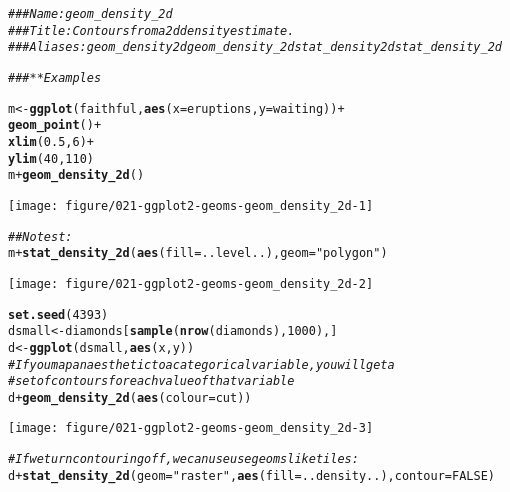 \documentclass[a4paper,titlepage]{tufte-handout}\usepackage[]{graphicx}\usepackage[]{color}
\makeatletter
\def\maxwidth{ %
  \ifdim\Gin@nat@width>\linewidth
    \linewidth
  \else
    \Gin@nat@width
  \fi
}
\newcommand{\hlnum}[1]{\textcolor[rgb]{0.686,0.059,0.569}{#1}}%
\newcommand{\hlstr}[1]{\textcolor[rgb]{0.192,0.494,0.8}{#1}}%
\newcommand{\hlcom}[1]{\textcolor[rgb]{0.678,0.584,0.686}{\textit{#1}}}%
\newcommand{\hlopt}[1]{\textcolor[rgb]{0,0,0}{#1}}%
\newcommand{\hlstd}[1]{\textcolor[rgb]{0.345,0.345,0.345}{#1}}%
\newcommand{\hlkwb}[1]{\textcolor[rgb]{0.69,0.353,0.396}{#1}}%
\newcommand{\hlkwc}[1]{\textcolor[rgb]{0.333,0.667,0.333}{#1}}%
\newcommand{\hlkwd}[1]{\textcolor[rgb]{0.737,0.353,0.396}{\textbf{#1}}}%
\newenvironment{kframe}{%
 \def\at@end@of@kframe{}%
 \ifinner\ifhmode%
  \def\at@end@of@kframe{\end{minipage}}%
  \begin{minipage}{\columnwidth}%
 \fi\fi%
 \def\FrameCommand##1{\hskip\@totalleftmargin \hskip-\fboxsep
 \colorbox{shadecolor}{##1}\hskip-\fboxsep
     \hskip-\linewidth \hskip-\@totalleftmargin \hskip\columnwidth}%
 \MakeFramed {\advance\hsize-\width
   \@totalleftmargin\z@ \linewidth\hsize
   \@setminipage}}%
 {\par\unskip\endMakeFramed%
 \at@end@of@kframe}
\newenvironment{knitrout}{}{} %
\makeatother
\begin{document}
\begin{knitrout}
\color{fgcolor}\begin{kframe}
\begin{alltt}
\hlcom{### Name: geom_density_2d}
\hlcom{### Title: Contours from a 2d density estimate.}
\hlcom{### Aliases: geom_density2d geom_density_2d stat_density2d stat_density_2d}

\hlcom{### ** Examples}

\hlstd{m} \hlkwb{<-} \hlkwd{ggplot}\hlstd{(faithful,} \hlkwd{aes}\hlstd{(}\hlkwc{x} \hlstd{= eruptions,} \hlkwc{y} \hlstd{= waiting))} \hlopt{+}
 \hlkwd{geom_point}\hlstd{()} \hlopt{+}
 \hlkwd{xlim}\hlstd{(}\hlnum{0.5}\hlstd{,} \hlnum{6}\hlstd{)} \hlopt{+}
 \hlkwd{ylim}\hlstd{(}\hlnum{40}\hlstd{,} \hlnum{110}\hlstd{)}
\hlstd{m} \hlopt{+} \hlkwd{geom_density_2d}\hlstd{()}
\end{alltt}
\end{kframe}
\texttt{[image: figure/021-ggplot2-geoms-geom\_density\_2d-1]} 
\begin{kframe}\begin{alltt}
\hlcom{## No test: }
\hlstd{m} \hlopt{+} \hlkwd{stat_density_2d}\hlstd{(}\hlkwd{aes}\hlstd{(}\hlkwc{fill} \hlstd{= ..level..),} \hlkwc{geom} \hlstd{=} \hlstr{"polygon"}\hlstd{)}
\end{alltt}
\end{kframe}
\texttt{[image: figure/021-ggplot2-geoms-geom\_density\_2d-2]} 
\begin{kframe}\begin{alltt}
\hlkwd{set.seed}\hlstd{(}\hlnum{4393}\hlstd{)}
\hlstd{dsmall} \hlkwb{<-} \hlstd{diamonds[}\hlkwd{sample}\hlstd{(}\hlkwd{nrow}\hlstd{(diamonds),} \hlnum{1000}\hlstd{), ]}
\hlstd{d} \hlkwb{<-} \hlkwd{ggplot}\hlstd{(dsmall,} \hlkwd{aes}\hlstd{(x, y))}
\hlcom{# If you map an aesthetic to a categorical variable, you will get a}
\hlcom{# set of contours for each value of that variable}
\hlstd{d} \hlopt{+} \hlkwd{geom_density_2d}\hlstd{(}\hlkwd{aes}\hlstd{(}\hlkwc{colour} \hlstd{= cut))}
\end{alltt}
\end{kframe}
\texttt{[image: figure/021-ggplot2-geoms-geom\_density\_2d-3]} 
\begin{kframe}\begin{alltt}
\hlcom{# If we turn contouring off, we can use use geoms like tiles:}
\hlstd{d} \hlopt{+} \hlkwd{stat_density_2d}\hlstd{(}\hlkwc{geom} \hlstd{=} \hlstr{"raster"}\hlstd{,} \hlkwd{aes}\hlstd{(}\hlkwc{fill} \hlstd{= ..density..),} \hlkwc{contour} \hlstd{=} \hlnum{FALSE}\hlstd{)}

\end{alltt}
\end{kframe}
\end{knitrout}
\end{document}
